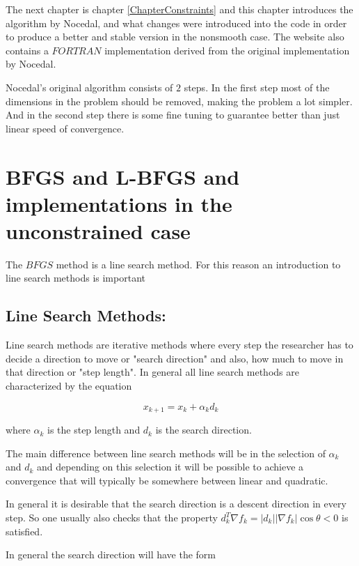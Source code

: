 The next chapter is chapter \ref{ChapterConstraints} and this chapter introduces the algorithm by Nocedal, and what changes were introduced into the code in order to produce a better and stable version in the nonsmooth case.  The website also contains a $FORTRAN$ implementation derived from the original implementation by Nocedal.

Nocedal's original algorithm consists of $2$ steps.  In the first step most of the dimensions in the problem should be removed, making the problem a lot simpler.  And in the second step there is some fine tuning to guarantee better than just linear speed of convergence.

\chapter{BFGS and L-BFGS and implementations in the unconstrained case}
\label{ChapterBFGS} %

The $BFGS$ method is a line search method. For this reason an introduction to line search methods is important

\section{Line Search Methods:}

Line search methods are iterative methods where every step the researcher has to decide a direction to move or "search direction" and also, how much to move in that direction or "step length".  In general all line search methods are characterized by the equation

\begin{equation} \label{basiclinesearch}
  x_{k+1} = x_k + \alpha_k d_k
\end{equation}

where $\alpha_k$ is the step length and $d_k$ is the search direction.

The main difference between line search methods will be in the selection of $\alpha_k$ and $d_k$ and depending on this selection it will be possible to achieve a convergence that will typically be somewhere between linear and quadratic.

In general it is desirable that the search direction is a descent direction in every step.  So one usually also checks that the property $d_k^T \nabla f_k = |d_k||\nabla f_k| \cos{\theta} < 0$ is satisfied.

In general the search direction will have the form 

